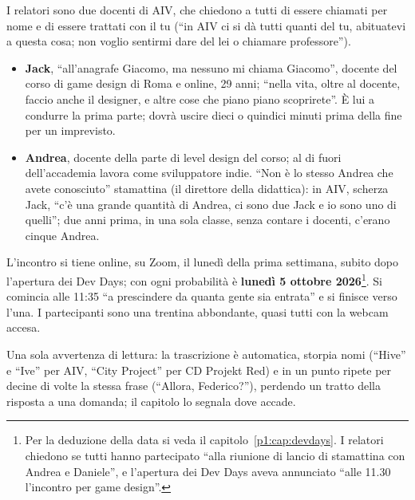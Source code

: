 I relatori sono due docenti di AIV, che chiedono a tutti di essere chiamati
per nome e di essere trattati con il tu (``in AIV ci si dà tutti quanti del
tu, abituatevi a questa cosa; non voglio sentirmi dare del lei o chiamare
professore'').
\begin{itemize}
  \item \textbf{Jack}, ``all'anagrafe Giacomo, ma nessuno mi chiama
        Giacomo'', docente del corso di game design di Roma e online, 29
        anni; ``nella vita, oltre al docente, faccio anche il designer, e
        altre cose che piano piano scoprirete''. È lui a condurre la prima
        parte; dovrà uscire dieci o quindici minuti prima della fine per un
        imprevisto.
  \item \textbf{Andrea}, docente della parte di level design del corso; al
        di fuori dell'accademia lavora come sviluppatore indie. ``Non è lo
        stesso Andrea che avete conosciuto'' stamattina (il direttore della
        didattica): in AIV, scherza Jack, ``c'è una grande quantità di
        Andrea, ci sono due Jack e io sono uno di quelli''; due anni prima,
        in una sola classe, senza contare i docenti, c'erano cinque Andrea.
\end{itemize}

L'incontro si tiene online, su Zoom, il lunedì della prima settimana,
subito dopo l'apertura dei Dev Days; con ogni probabilità è \textbf{lunedì 5
ottobre 2026}\footnote{Per la deduzione della data si veda il
capitolo~\ref{p1:cap:devdays}. I relatori chiedono se tutti hanno
partecipato ``alla riunione di lancio di stamattina con Andrea e Daniele'',
e l'apertura dei Dev Days aveva annunciato ``alle 11.30 l'incontro per game
design''.}. Si comincia alle 11:35 ``a prescindere da quanta gente sia
entrata'' e si finisce verso l'una. I partecipanti sono una trentina abbondante,
quasi tutti con la webcam accesa.

Una sola avvertenza di lettura: la trascrizione è automatica, storpia nomi
(``Hive'' e ``Ive'' per AIV, ``City Project'' per CD Projekt Red) e in un
punto ripete per decine di volte la stessa frase (``Allora, Federico?''),
perdendo un tratto della risposta a una domanda; il capitolo lo segnala dove
accade.

